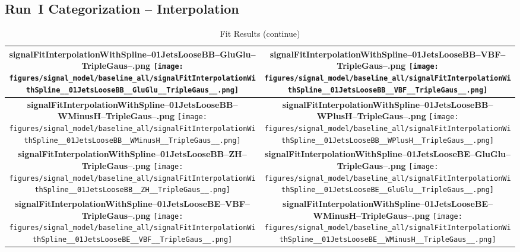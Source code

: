 \subsection{Run~I Categorization -- Interpolation}
\begin{longtable}{|c|c|}
\caption{Fit Results}
\endfirsthead
\caption{Fit Results (continue)}
\endhead
\hline
\parbox{0.49\textwidth}{
\centering
{\bfseries signalFitInterpolationWithSpline--01JetsLooseBB--GluGlu--TripleGaus--.png}
\texttt{[image: figures/signal\_model/baseline\_all/signalFitInterpolationWithSpline\_\_01JetsLooseBB\_\_GluGlu\_\_TripleGaus\_\_.png]}
}
 & \parbox{0.49\textwidth}{
\centering
{\bfseries signalFitInterpolationWithSpline--01JetsLooseBB--VBF--TripleGaus--.png}
\texttt{[image: figures/signal\_model/baseline\_all/signalFitInterpolationWithSpline\_\_01JetsLooseBB\_\_VBF\_\_TripleGaus\_\_.png]}
}
 \\
\hline
\parbox{0.49\textwidth}{
\centering
{\bfseries signalFitInterpolationWithSpline--01JetsLooseBB--WMinusH--TripleGaus--.png}
\texttt{[image: figures/signal\_model/baseline\_all/signalFitInterpolationWithSpline\_\_01JetsLooseBB\_\_WMinusH\_\_TripleGaus\_\_.png]}
}
 & \parbox{0.49\textwidth}{
\centering
{\bfseries signalFitInterpolationWithSpline--01JetsLooseBB--WPlusH--TripleGaus--.png}
\texttt{[image: figures/signal\_model/baseline\_all/signalFitInterpolationWithSpline\_\_01JetsLooseBB\_\_WPlusH\_\_TripleGaus\_\_.png]}
}
 \\
\hline
\parbox{0.49\textwidth}{
\centering
{\bfseries signalFitInterpolationWithSpline--01JetsLooseBB--ZH--TripleGaus--.png}
\texttt{[image: figures/signal\_model/baseline\_all/signalFitInterpolationWithSpline\_\_01JetsLooseBB\_\_ZH\_\_TripleGaus\_\_.png]}
}
 & \parbox{0.49\textwidth}{
\centering
{\bfseries signalFitInterpolationWithSpline--01JetsLooseBE--GluGlu--TripleGaus--.png}
\texttt{[image: figures/signal\_model/baseline\_all/signalFitInterpolationWithSpline\_\_01JetsLooseBE\_\_GluGlu\_\_TripleGaus\_\_.png]}
}
 \\
\hline
\parbox{0.49\textwidth}{
\centering
{\bfseries signalFitInterpolationWithSpline--01JetsLooseBE--VBF--TripleGaus--.png}
\texttt{[image: figures/signal\_model/baseline\_all/signalFitInterpolationWithSpline\_\_01JetsLooseBE\_\_VBF\_\_TripleGaus\_\_.png]}
}
 & \parbox{0.49\textwidth}{
\centering
{\bfseries signalFitInterpolationWithSpline--01JetsLooseBE--WMinusH--TripleGaus--.png}
\texttt{[image: figures/signal\_model/baseline\_all/signalFitInterpolationWithSpline\_\_01JetsLooseBE\_\_WMinusH\_\_TripleGaus\_\_.png]}
}
\end{longtable}

